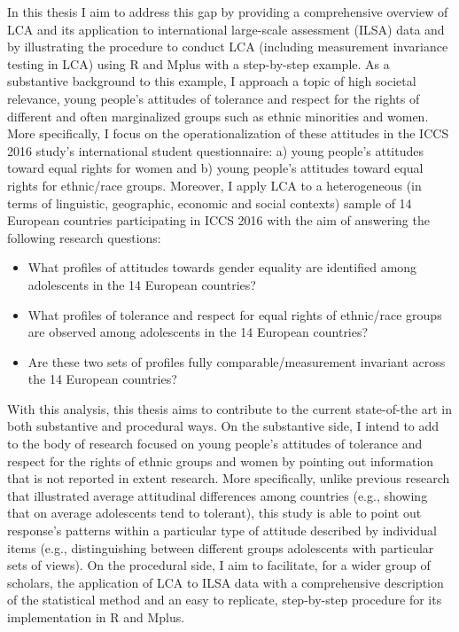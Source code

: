 \documentclass[12pt,a4paper,oneside]{reedthesis}
\providecommand{\tightlist}{%
  \setlength{\itemsep}{0pt}\setlength{\parskip}{0pt}}
\begin{document}
In this thesis I aim to address this gap by providing a comprehensive overview of LCA and its application to international large-scale assessment (ILSA) data and by illustrating the procedure to conduct LCA (including measurement invariance testing in LCA) using R and Mplus with a step-by-step example. As a substantive background to this example, I approach a topic of high societal relevance, young people's attitudes of tolerance and respect for the rights of different and often marginalized groups such as ethnic minorities and women. More specifically, I focus on the operationalization of these attitudes in the ICCS 2016 study's international student questionnaire: a) young people's attitudes toward equal rights for women and b) young people's attitudes toward equal rights for ethnic/race groups. Moreover, I apply LCA to a heterogeneous (in terms of linguistic, geographic, economic and social contexts) sample of 14 European countries participating in ICCS 2016 with the aim of answering the following research questions:
\begin{itemize}
\tightlist
\item
  What profiles of attitudes towards gender equality are identified among adolescents in the 14 European countries?\\
\item
  What profiles of tolerance and respect for equal rights of ethnic/race groups are observed among adolescents in the 14 European countries?\\
\item
  Are these two sets of profiles fully comparable/measurement invariant across the 14 European countries?
\end{itemize}
With this analysis, this thesis aims to contribute to the current state-of-the art in both substantive and procedural ways. On the substantive side, I intend to add to the body of research focused on young people's attitudes of tolerance and respect for the rights of ethnic groups and women by pointing out information that is not reported in extent research. More specifically, unlike previous research that illustrated average attitudinal differences among countries (e.g., showing that on average adolescents tend to tolerant), this study is able to point out response's patterns within a particular type of attitude described by individual items (e.g., distinguishing between different groups adolescents with particular sets of views). On the procedural side, I aim to facilitate, for a wider group of scholars, the application of LCA to ILSA data with a comprehensive description of the statistical method and an easy to replicate, step-by-step procedure for its implementation in R and Mplus.
\end{document}
